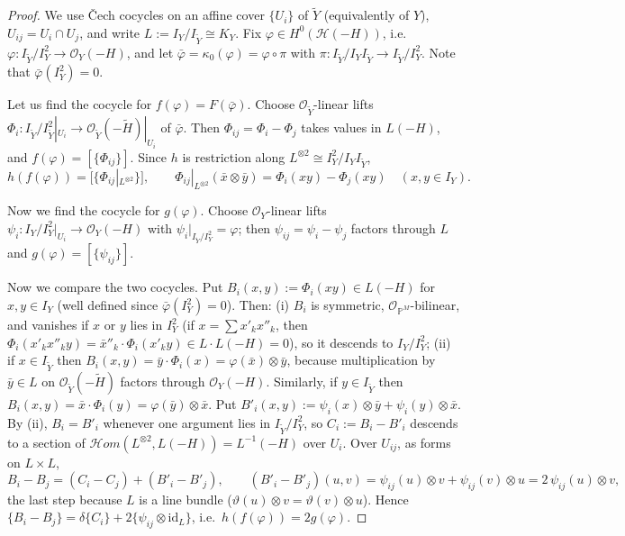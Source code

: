 \documentclass[11pt,twoside]{amsart}
\theoremstyle{plain}
\theoremstyle{definition}
\newcommand{\OO}{\mathcal{O}}
\newcommand{\sHom}{\mathcal{H}om}
\newcommand{\id}{\mathrm{id}}
\newcommand{\Yt}{\widetilde{Y}}
\newcommand{\Ht}{\widetilde{H}}
\newcommand{\Hc}{\mathcal{H}}
\begin{document}
\begin{proof}
We use \v{C}ech cocycles on an affine cover $\{U_i\}$ of $\Yt$ (equivalently of $Y$), $U_{ij}=U_i\cap U_j$, and write $L:=I_Y/I_{\Yt}\cong K_Y$. Fix $\varphi\in H^0(\Hc(-H))$, i.e.\ $\varphi\colon I_{\Yt}/I_Y^2\to\OO_Y(-H)$, and let $\bar\varphi=\kappa_0(\varphi)=\varphi\circ\pi$ with $\pi\colon I_{\Yt}/I_YI_{\Yt}\to I_{\Yt}/I_Y^2$. Note that $\bar\varphi(I_Y^2)=0$. \par

Let us find the cocycle for  $f(\varphi)=F(\bar\varphi)$. Choose $\OO_{\Yt}$-linear lifts $\Phi_i\colon I_{\Yt}/I_{\Yt}^2|_{U_i}\to\OO_{\Yt}(-\Ht)|_{U_i}$ of $\bar\varphi$. Then $\Phi_{ij}=\Phi_i-\Phi_j$ takes values in $L(-H)$, and $f(\varphi)=[\{\Phi_{ij}\}]$. Since $h$ is restriction along $L^{\otimes2}\cong I_Y^2/I_YI_{\Yt}$,
\[
h(f(\varphi))=\big[\{\Phi_{ij}|_{L^{\otimes 2}}\}\big],\qquad \Phi_{ij}|_{L^{\otimes2}}(\bar x\otimes\bar y)=\Phi_i(xy)-\Phi_j(xy)\quad(x,y\in I_Y).
\]

Now we find the cocycle for $g(\varphi)$. Choose $\OO_Y$-linear lifts $\psi_i\colon I_Y/I_Y^2|_{U_i}\to\OO_Y(-H)$ with $\psi_i|_{I_{\Yt}/I_Y^2}=\varphi$; then $\psi_{ij}=\psi_i-\psi_j$ factors through $L$ and $g(\varphi)=[\{\psi_{ij}\}]$.

Now we compare the two cocycles. Put $B_i(x,y):=\Phi_i(xy)\in L(-H)$ for $x,y\in I_Y$ (well defined since $\bar\varphi(I_Y^2)=0$). Then: (i) $B_i$ is symmetric, $\OO_{\mathbb{P}^M}$-bilinear, and vanishes if $x$ or $y$ lies in $I_Y^2$ (if $x=\sum x'_kx''_k$, then $\Phi_i(x'_kx''_ky)=\bar x''_k\cdot\Phi_i(x'_ky)\in L\cdot L(-H)=0$), so it descends to $I_Y/I_Y^2$; (ii) if $x\in I_{\Yt}$ then $B_i(x,y)=\bar y\cdot\Phi_i(x)=\varphi(\bar x)\otimes\bar y$, because multiplication by $\bar y\in L$ on $\OO_{\Yt}(-\Ht)$ factors through $\OO_Y(-H)$. Similarly, if $y\in I_{\Yt}$ then $B_i(x,y)=\bar x\cdot\Phi_i(y)=\varphi(\bar y)\otimes\bar x$. Put $B'_i(x,y):=\psi_i(x)\otimes\bar y+\psi_i(y)\otimes\bar x$. By (ii), $B_i=B'_i$ whenever one argument lies in $I_{\Yt}/I_Y^2$, so $C_i:=B_i-B'_i$ descends to a section of $\sHom(L^{\otimes2},L(-H))=L^{-1}(-H)$ over $U_i$. Over $U_{ij}$, as forms on $L\times L$,
\[
B_i-B_j=(C_i-C_j)+(B'_i-B'_j),\qquad (B'_i-B'_j)(u,v)=\psi_{ij}(u)\otimes v+\psi_{ij}(v)\otimes u=2\,\psi_{ij}(u)\otimes v,
\]
the last step because $L$ is a line bundle ($\vartheta(u)\otimes v=\vartheta(v)\otimes u$). Hence $\{B_i-B_j\}=\delta\{C_i\}+2\{\psi_{ij}\otimes\id_L\}$, i.e.\ $h(f(\varphi))=2g(\varphi)$.
\end{proof}
\end{document}
